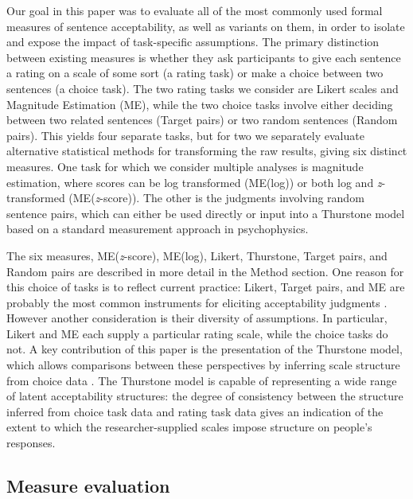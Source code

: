 \documentclass[doc]{apa6}
\newcommand{\targchoice}{{\sc Target pairs}}
\newcommand{\rndchoice}{{\sc Random pairs}}
\newcommand{\MElog}{{\sc ME{(log)}}}
\newcommand{\MEz}{{\sc ME{({\it z}-score)}}}
\newcommand{\ME}{{\sc ME}}%
\newcommand{\thurstone}{{\sc Thurstone}}
\newcommand{\likert}{{\sc Likert}}
\newcommand{\choicetask}{choice task}
\newcommand{\ratingtask}{rating task}
\begin{document}
Our goal in this paper was to evaluate all of the most commonly used formal measures of sentence acceptability, as well as variants on them, in order to isolate and expose the impact of task-specific assumptions. The primary distinction between existing measures is whether they ask participants to give each sentence a rating on a scale of some sort (a \ratingtask) or make a choice between two sentences (a \choicetask). The two {\ratingtask}s we consider are \likert{} scales %
and Magnitude Estimation (\ME), %
while the two {\choicetask}s involve either deciding between two related sentences (\targchoice) or two random sentences (\rndchoice). This yields four separate tasks, but for two we separately evaluate alternative statistical methods for transforming the raw results, giving six distinct measures. One task for which we consider multiple analyses is magnitude estimation, where scores  can be log transformed (\MElog) or both log and {\it z}-transformed (\MEz). The other is the judgments involving random sentence pairs, which can either be used directly or input into a \thurstone{} model based on a standard measurement approach in psychophysics.

The six measures, \MEz, \MElog, \likert, \thurstone, \targchoice, and \rndchoice{} are described in more detail in the Method section. One reason for this choice of tasks is to reflect current practice: \likert, \targchoice, and \ME{} are probably the most common instruments for eliciting acceptability judgments \citep{podesva2014researchmethods}. However another consideration is their diversity of assumptions. In particular, \likert{} and \ME{} each supply a particular rating scale, while the {\choicetask}s do not. A key contribution of this paper is the presentation of the \thurstone{} model, which allows comparisons between these perspectives by inferring scale structure from choice data  \citep{thurstone1927lawofcomparativejudgment}. The \thurstone{} model is capable of representing a wide range of latent acceptability structures: the degree of consistency between the structure inferred from \choicetask{ }data and \ratingtask{ }data gives an indication of the extent to which the researcher-supplied scales impose structure on people's responses.


\subsection{Measure evaluation}
\end{document}
